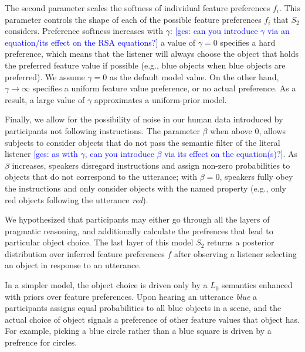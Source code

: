 \documentclass[10pt,a4paper]{article}
\newcommand{\gcs}[1]{\textcolor{blue}{[gcs: #1]}}
\begin{document}
The second parameter scales the softness of individual feature preferences $f_i$. 
This parameter controls the shape of each of the possible feature preferences $f_i$ that $S_2$ considers. 
Preference softness increases with $\gamma$: \gcs{can you introduce $\gamma$ via an equation/its effect on the RSA equations?}
a value of $\gamma=0$ specifies a hard preference, which means that the listener will always choose the object that holds the preferred feature value if possible (e.g., blue objects when blue objects are preferred). 
We assume $\gamma=0$ as the default model value. 
On the other hand, $\gamma \rightarrow \infty$ specifies a uniform feature value preference, or no actual preference.
As a result, a large value of $\gamma$ approximates a uniform-prior model. %

Finally, we allow for the possibility of noise in our human data introduced by participants not following instructions. The parameter $\beta$ when above 0, allows subjects to consider objects that do not pass the semantic filter of the literal listener \gcs{as with $\gamma$, can you introduce $\beta$ via its effect on the equation(s)?}. As $\beta$ increases, speakers disregard instructions and assign non-zero probabilities to objects that do not correspond to the utterance; with $\beta = 0$, speakers fully obey the instructions and only consider objects with the named property (e.g., only red objects following the utterance \textit{red}).


We hypothesized that participants may either go through all the layers of pragmatic reasoning, and additionally calculate the prefrences that lead to particular object choice. The last layer of this model $S_2$  returns a posterior distribution over inferred feature preferences $f$ after observing a listener selecting an object in response to an utterance. 

In a simpler model, the object choice is driven only by a $L_0$ semantics enhanced with priors over feature preferences. Upon hearing an utterance \textit{blue} a participants assigns equal probabilities to all blue objects in a scene, and the actual choice of object signals a preference of other feature values that object has. For example, picking a blue circle rather than a blue square is driven by a prefrence for circles.
\end{document}

